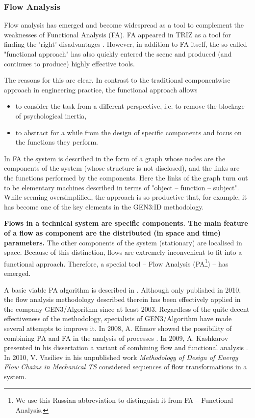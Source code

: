 \documentclass[a4paper,11pt]{article}
\begin{document}
\subsubsection*{Flow Analysis}

Flow analysis has emerged and become widespread as a tool to complement the
weaknesses of Functional Analysis (FA). FA appeared in TRIZ as a tool for
finding the 'right' disadvantages \cite{B7,B8}. However, in addition to FA
itself, the so-called "functional approach" has also quickly entered the scene
and produced (and continues to produce) highly effective tools.

The reasons for this are clear. In contrast to the traditional componentwise
approach in engineering practice, the functional approach allows
\begin{itemize}
\item to consider the task from a different perspective, i.e. to remove the
  blockage of psychological inertia,
\item to abstract for a while from the design of specific components and focus
  on the functions they perform.
\end{itemize}
In FA the system is described in the form of a graph whose nodes are the
components of the system (whose structure is not disclosed), and the links are
the functions performed by the components. Here the links of the graph turn
out to be elementary machines described in terms of "object -- function --
subject". While seeming oversimplified, the approach is so productive that,
for example, it has become one of the key elements in the GEN3:ID methodology.

\textbf{Flows in a technical system are specific components. The main feature
  of a flow as component are the distributed (in space and time) parameters.}
The other components of the system (stationary) are localised in space.
Because of this distinction, flows are extremely inconvenient to fit into a
functional approach. Therefore, a special tool -- Flow Analysis
(PA\footnote{We use this Russian abbreviation to distinguish it from FA --
  Functional Analysis.}) -- has emerged.

A basic viable PA algorithm is described in \cite{B9}. Although only published
in 2010, the flow analysis methodology described therein has been effectively
applied in the company GEN3/Algorithm since at least 2003. Regardless of the
quite decent effectiveness of the methodology, specialists of GEN3/Algorithm
have made several attempts to improve it. In 2008, A. Efimov showed the
possibility of combining PA and FA in the analysis of processes \cite{B10}. In
2009, A. Kashkarov presented in his dissertation a variant of combining flow
and functional analysis \cite{B11}. In 2010, V. Vasiliev in his unpublished
work \emph{Methodology of Design of Energy Flow Chains in Mechanical TS}
considered sequences of flow transformations in a system.
\end{document}
